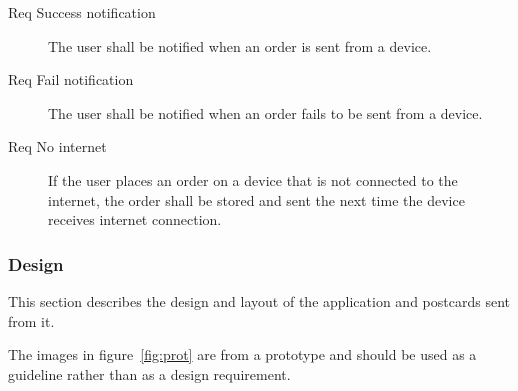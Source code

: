 \documentclass[10pt,a4paper]{article}
\begin{document}
\begin{description}
	\item [Req \thesubsubsection {.\theproduct} Success notification] The user shall be notified when an order is sent from a device.
	\item [Req \thesubsubsection {.\theproduct} Fail notification] The user shall be notified when an order fails to be sent from a device.

	\item [Req \thesubsubsection {.\theproduct} No internet] If the user places an order on a device that is not connected to the internet, the order shall be stored and sent the next time the device receives internet connection. 
\end{description}

\subsubsection{Design}
This section describes the design and layout of the application and postcards sent from it. 

The images in figure~\ref{fig:prot} are from a prototype and should be used as a guideline rather than as a design requirement.
\end{document}
